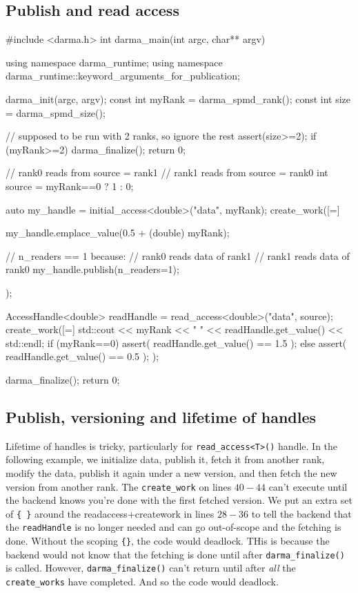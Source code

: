\subsection{Publish and read access}

\begin{CppCodeNumb}
#include <darma.h>
int darma_main(int argc, char** argv)
{
  using namespace darma_runtime;
  using namespace darma_runtime::keyword_arguments_for_publication;

  darma_init(argc, argv);
  const int myRank = darma_spmd_rank();
  const int size = darma_spmd_size();

  // supposed to be run with 2 ranks, so ignore the rest
  assert(size>=2);
  if (myRank>=2){
    darma_finalize();
    return 0;
  }

  // rank0 reads from source = rank1 
  // rank1 reads from source = rank0 
  int source = myRank==0 ? 1 : 0;

  auto my_handle = initial_access<double>("data", myRank);
  create_work([=]
  {
    my_handle.emplace_value(0.5 + (double) myRank);

    // n_readers == 1 because: 
    //  rank0 reads data of rank1
    //  rank1 reads data of rank0
    my_handle.publish(n_readers=1);
  });

  AccessHandle<double> readHandle = read_access<double>("data", source);
  create_work([=]
  {
    std::cout << myRank << " " << readHandle.get_value() << std::endl;
    if (myRank==0)
      assert( readHandle.get_value() == 1.5 );
    else
      assert( readHandle.get_value() == 0.5 );
  });

  darma_finalize();
  return 0;
}
\end{CppCodeNumb}






\subsection{Publish, versioning and lifetime of handles}

Lifetime of handles is tricky, particularly for \texttt{read\_access<T>()} handle.  
In the following example, we initialize data, publish it, fetch it from another rank, 
modify the data, publish it again under a new version, and then fetch the new version from another rank. 
The \texttt{create\_work} on lines $40-44$ can't execute until the backend knows you're done with the first fetched version. 
We put an extra set of \texttt{\{ \}} around the readaccess+creatework in lines $28-36$ to tell the backend that 
the \texttt{readHandle} is no longer needed and can go out-of-scope and the fetching is done.  
Without the scoping \texttt{\{\}}, the code would deadlock. THis is because the backend would not know that 
the fetching is done until after \texttt{darma\_finalize()} is called. However, \texttt{darma\_finalize()} 
can't return until after {\it all} the \texttt{create\_works} have completed.  And so the code would deadlock. 


